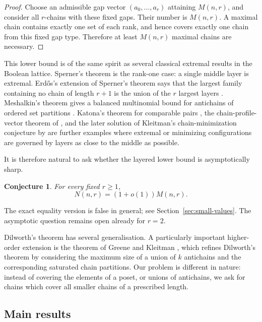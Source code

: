 \documentclass[11pt]{article}
\newtheorem{conjecture}[theorem]{Conjecture}
\theoremstyle{definition}
\theoremstyle{remark}
\begin{document}
\begin{proof}
Choose an admissible gap vector $(a_0,\ldots,a_r)$ attaining $M(n,r)$, and consider all $r$-chains with these fixed gaps.  Their number is $M(n,r)$.  A maximal chain contains exactly one set of each rank, and hence covers exactly one chain from this fixed gap type.  Therefore at least $M(n,r)$ maximal chains are necessary.
\end{proof}

This lower bound is of the same spirit as several classical extremal results in the Boolean lattice.  Sperner's theorem is the rank-one case: a single middle layer is extremal.  Erd\H{o}s's extension of Sperner's theorem says that the largest family containing no chain of length $r+1$ is the union of the $r$ largest layers \citep{Erdos1945}.  Meshalkin's theorem gives a balanced multinomial bound for antichains of ordered set partitions \citep{Meshalkin1963}.  Katona's theorem for comparable pairs \citep{Katona1973}, the chain-profile-vector theorem of \citet{GerbnerPatkos2008}, and the later solution of Kleitman's chain-minimization conjecture by \citet{Samotij2019} are further examples where extremal or minimizing configurations are governed by layers as close to the middle as possible.

It is therefore natural to ask whether the layered lower bound is asymptotically sharp.

\begin{conjecture}\label{conj:fixed-r}
For every fixed $r\ge 1$,
\[
   N(n,r)=(1+o(1))M(n,r).
\]
\end{conjecture}

The exact equality version is false in general; see Section~\ref{sec:small-values}.  The asymptotic question remains open already for $r=2$. 

Dilworth's theorem has several generalisation. A particularly important higher-order extension is the theorem of Greene and Kleitman \cite{Greene}, which refines Dilworth's theorem by considering the maximum size of a union of $k$ antichains and the corresponding saturated chain partitions.  Our problem is different in nature: instead of covering the elements of a poset, or unions of antichains, we ask for chains which cover all smaller chains of a prescribed length.

\subsection*{Main results}
\end{document}
